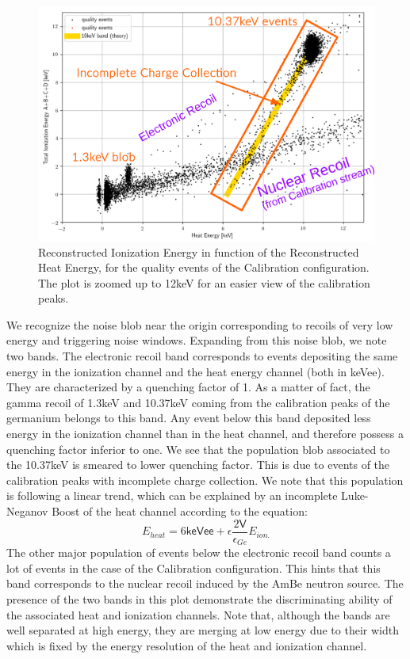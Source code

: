 \begin{figure}
\centering
\includegraphics[width=\linewidth,]{Figures/Neutron/ecei_plot.png}
\caption{Reconstructed Ionization Energy in function of the Reconstructed Heat Energy, for the quality events of the Calibration configuration. The plot is zoomed up to 12keV for an easier view of the calibration peaks. }
\label{fig:ecei-plot}
\end{figure}

We recognize the noise blob near the origin corresponding to recoils of very low energy and triggering noise windows. Expanding from this noise blob, we note two bands. 
The electronic recoil band corresponds to events depositing the same energy in the ionization channel and the heat energy channel (both in keVee). They are characterized by a quenching factor of 1. As a matter of fact, the gamma recoil of 1.3keV and 10.37keV coming from the calibration peaks of the germanium belongs to this band. Any event below this band deposited less energy in the ionization channel than in the heat channel, and therefore possess a quenching factor inferior to one. We see that the population blob associated to the 10.37keV is smeared to lower quenching factor. This is due to events of the calibration peaks with incomplete charge collection. We note that this population is following a linear trend, which can be explained by an incomplete Luke-Neganov Boost of the heat channel according to the equation:
\begin{equation}
E_{heat} = 6 \textsf{keVee} + \epsilon \frac{2 \textsf{V}}{\epsilon_{Ge}} E_{ion.}
\end{equation}
The other major population of events below the electronic recoil band counts a lot of events in the case of the Calibration configuration. This hints that this band corresponds to the nuclear recoil induced by the AmBe neutron source.
The presence of the two bands in this plot demonstrate the discriminating ability of the associated heat and ionization channels. Note that, although the bands are well separated at high energy, they are merging at low energy due to their width which is fixed by the energy resolution of the heat and ionization channel.

